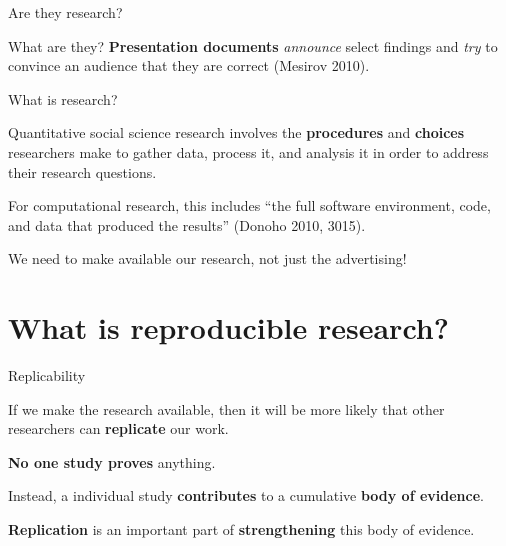 \documentclass[10pt]{beamer}
\begin{document}
\begin{frame}{Are they research?}

    \begin{block}{What are they?}
        \textbf{Presentation documents} \emph{announce} select findings and \emph{try} to convince an audience that they are correct (Mesirov 2010).
    \end{block}
\end{frame}

\begin{frame}{What is research?}

    Quantitative social science research involves the \textbf{procedures} and \textbf{choices} researchers make to gather data, process it, and analysis it in order to address their research questions.

    \vspace{1cm}

    For {\large{computational research}}, this includes ``the {\large{full software environment, code, and data}} that produced the results'' (Donoho 2010, 3015).

\end{frame}

\begin{frame}
    \begin{center}
        {\large{We need to make available our research, not just the advertising!}}
    \end{center}
\end{frame}


\section{What is reproducible research?}

\begin{frame}{Replicability}

    If we make the research available, then it will be {\large{more likely}} that other researchers can \textbf{replicate} our work.

    \vspace{1cm}

    \textbf{No one study proves} anything.

    \vspace{0.5cm}

    Instead, a individual study \textbf{contributes} to a cumulative \textbf{body of evidence}.

    \vspace{0.5cm}

    \textbf{Replication} is an important part of \textbf{strengthening} this body of evidence.

\end{frame}
\end{document}
